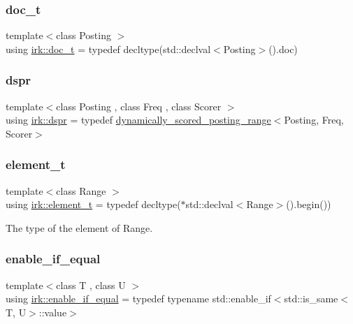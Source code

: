 \subsubsection{\texorpdfstring{doc\+\_\+t}{doc\_t}}
{\footnotesize\ttfamily template$<$class Posting $>$ \\
using \mbox{\hyperlink{namespaceirk_af5d95ec091f3bd711790e71ccb533903}{irk\+::doc\+\_\+t}} = typedef decltype(std\+::declval$<$Posting$>$().doc)}

\mbox{\label{namespaceirk_af92c7aae439f59ccae252f027f851c24}} 
\subsubsection{\texorpdfstring{dspr}{dspr}}
{\footnotesize\ttfamily template$<$class Posting , class Freq , class Scorer $>$ \\
using \mbox{\hyperlink{namespaceirk_af92c7aae439f59ccae252f027f851c24}{irk\+::dspr}} = typedef \mbox{\hyperlink{classirk_1_1dynamically__scored__posting__range}{dynamically\+\_\+scored\+\_\+posting\+\_\+range}}$<$Posting, Freq, Scorer$>$}

\mbox{\label{namespaceirk_a44ec708d671914dae1d40355ac05c280}} 
\subsubsection{\texorpdfstring{element\+\_\+t}{element\_t}}
{\footnotesize\ttfamily template$<$class Range $>$ \\
using \mbox{\hyperlink{namespaceirk_a44ec708d671914dae1d40355ac05c280}{irk\+::element\+\_\+t}} = typedef decltype($\ast$std\+::declval$<$Range$>$().begin())}



The type of the element of Range. 

\mbox{\label{namespaceirk_a57b757ac14c20845b38f720c2ad8e822}} 
\subsubsection{\texorpdfstring{enable\+\_\+if\+\_\+equal}{enable\_if\_equal}}
{\footnotesize\ttfamily template$<$class T , class U $>$ \\
using \mbox{\hyperlink{namespaceirk_a57b757ac14c20845b38f720c2ad8e822}{irk\+::enable\+\_\+if\+\_\+equal}} = typedef typename std\+::enable\+\_\+if$<$std\+::is\+\_\+same$<$T, U$>$\+::value$>$}

